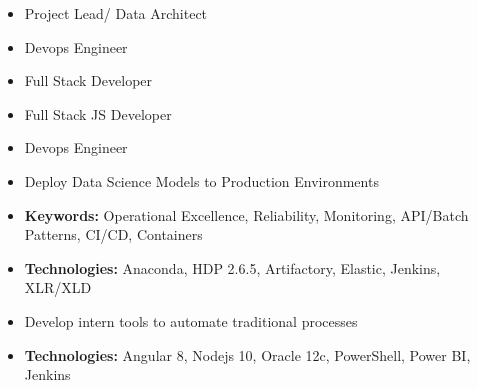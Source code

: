 \documentclass[10pt,a4paper,ragged2e]{altacv}
\begin{document}
\begin{paracol}{2}


\begin{itemize}
\item Project Lead/ Data Architect
\item Devops Engineer
\item Full Stack Developer
\end{itemize}

\divider

\begin{itemize}
\item Full Stack JS Developer
\item Devops Engineer
\end{itemize}


\begin{itemize}
\item Deploy Data Science Models to Production Environments
\item \textbf{Keywords:} Operational Excellence, Reliability, Monitoring, API/Batch Patterns, CI/CD, Containers
\item \textbf{Technologies:} Anaconda, HDP 2.6.5, Artifactory, Elastic, Jenkins, XLR/XLD
\end{itemize}

\divider

\begin{itemize}
\item Develop intern tools to automate traditional processes
\item \textbf{Technologies:} Angular 8, Nodejs 10, Oracle 12c, PowerShell, Power BI, Jenkins
\end{itemize}
\medskip


\end{paracol}
\end{document}

